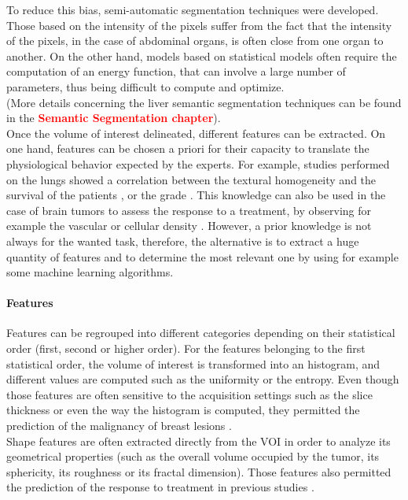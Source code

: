 \documentclass[]{article}
\let\oldparagraph\paragraph
\renewcommand{\paragraph}[1]{\oldparagraph{#1}\mbox{}}
\begin{document}
To reduce this bias, semi-automatic segmentation techniques were
developed. Those based on the intensity of the pixels suffer from the
fact that the intensity of the pixels, in the case of abdominal organs,
is often close from one organ to another. On the other hand, models
based on statistical models often require the computation of an energy
function, that can involve a large number of parameters, thus being
difficult to compute and optimize.\\
(More details concerning the liver semantic segmentation techniques can
be found in the \textcolor{red}{\textbf{Semantic Segmentation chapter}}).\\
Once the volume of interest delineated, different features can be
extracted. On one hand, features can be chosen a priori for their
capacity to translate the physiological behavior expected by the
experts. For example, studies performed on the lungs showed a
correlation between the textural homogeneity and the survival of the
patients \cite{Ganeshan2012,Balagurunathan2014}, or the grade
\cite{Al-Kadi2008}. This knowledge can also be used in the case of
brain tumors to assess the response to a treatment, by observing for
example the vascular or cellular density \cite{Cao2006,Zhou2014}. However, a prior knowledge is not always for the wanted
task, therefore, the alternative is to extract a huge quantity of
features and to determine the most relevant one by using for example
some machine learning algorithms.

\paragraph{Features}\label{features}

Features can be regrouped into different categories depending on their
statistical order (first, second or higher order). For the features
belonging to the first statistical order, the volume of interest is
transformed into an histogram, and different values are computed such as
the uniformity or the entropy. Even though those features are often
sensitive to the acquisition settings such as the slice thickness or
even the way the histogram is computed, they permitted the prediction of
the malignancy of breast lesions \cite{Parekh2016}.\\
Shape features are often extracted directly from the VOI in order to
analyze its geometrical properties (such as the overall volume occupied
by the tumor, its sphericity, its roughness or its fractal dimension).
Those features also permitted the prediction of the response to
treatment in previous studies \cite{Thawani2018}.
\end{document}
